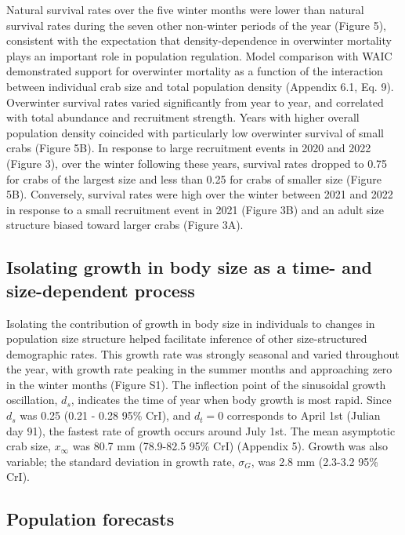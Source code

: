 \documentclass{article}
\begin{document}
Natural survival rates over the five winter months were lower than natural survival rates during the seven other non-winter periods of the year (Figure 5), consistent with the expectation that density-dependence in overwinter mortality plays an important role in population regulation. Model comparison with WAIC demonstrated support for overwinter mortality as a function of the interaction between individual crab size and total population density (Appendix 6.1, Eq. 9). Overwinter survival rates varied significantly from year to year, and correlated with total abundance and recruitment strength. Years with higher overall population density coincided with particularly low overwinter survival of small crabs (Figure 5B). In response to large recruitment events in 2020 and 2022 (Figure 3), over the winter following these years, survival rates dropped to 0.75 for crabs of the largest size and less than 0.25 for crabs of smaller size (Figure 5B). Conversely, survival rates were high over the winter between 2021 and 2022 in response to a small recruitment event in 2021 (Figure 3B) and an adult size structure biased toward larger crabs (Figure 3A). 

\subsection{Isolating growth in body size as a time- and size-dependent process}

Isolating the contribution of growth in body size in individuals to changes in population size structure helped facilitate inference of other size-structured demographic rates. This growth rate was strongly seasonal and varied throughout the year, with growth rate peaking in the summer months and approaching zero in the winter months (Figure S1). The inflection point of the sinusoidal growth oscillation, $d_s$, indicates the time of year when body growth is most rapid. Since $d_s$ was 0.25 (0.21 - 0.28 95\% CrI), and $d_t = 0$ corresponds to April 1st (Julian day 91), the fastest rate of growth occurs around July 1st. The mean asymptotic crab size, $x_{\infty}$ was 80.7 mm (78.9-82.5 95\% CrI) (Appendix 5). Growth was also variable; the standard deviation in growth rate, $\sigma_G$, was 2.8 mm (2.3-3.2 95\% CrI).

\subsection{Population forecasts}
\end{document}
